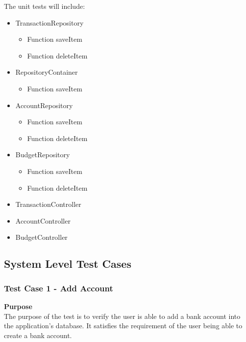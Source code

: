 \documentclass[12pt]{article}
\begin{document}
\setlength{\parskip}{0.8mm}
The unit tests will include:
\begin {itemize}
	\item TransactionRepository
	\begin {itemize}
		\item Function saveItem
		\item Function deleteItem
	\end {itemize}
	\item RepositoryContainer
	\begin {itemize}
		\item Function saveItem
	\end {itemize}
	\item AccountRepository
	\begin {itemize}
		\item Function saveItem
		\item Function deleteItem
	\end {itemize}
	\item BudgetRepository
	\begin {itemize}
		\item Function saveItem
		\item Function deleteItem
	\end {itemize}
	\item TransactionController
	\item AccountController
	\item BudgetController
\end {itemize}



\clearpage
\subsection{System Level Test Cases}


\subsubsection {Test Case 1 - Add Account} \label{TC-1}

\noindent
{\bf Purpose}\\
The purpose of the test is to verify the user is able to add a bank account into the application's database.
It satisfies the requirement of the user being able to create a bank account.
\end{document}
